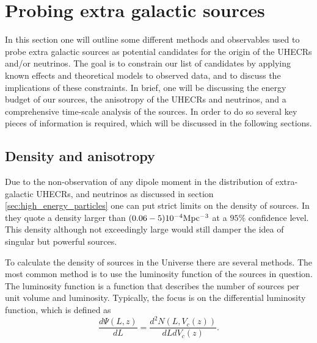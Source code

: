 \section{Probing extra galactic sources}

In this section one will outline some different methods and observables used to probe extra galactic sources as potential candidates for the origin of the UHECRs and/or neutrinos. The goal is to constrain our list of candidates by applying known effects and theoretical models to observed data, and to discuss the implications of these constraints. In brief, one will be discussing the energy budget of our sources, the anisotropy of the UHECRs and neutrinos, and a comprehensive time-scale analysis of the sources. In order to do so several key pieces of information is required, which will be discussed in the following sections.


\subsection{Density and anisotropy}

Due to the non-observation of any dipole moment in the distribution of extra-galactic UHECRs, and neutrinos as discussed in section \ref{sec:high_energy_particles} one can put strict limits on the density of sources. In \cite{ThePierreAugercollaboration_2013} they quote a density larger than $(0.06-5) 10^{-4} \rm{Mpc^{-3}}$ at a $95\% $ confidence level. This density although not exceedingly large would still damper the idea of singular but powerful sources. 

To calculate the density of sources in the Universe there are several methods. The most common method is to use the luminosity function of the sources in question.
The luminosity function is a function that describes the number of sources per unit volume and luminosity. Typically, the focus is on the differential luminosity function, which is defined as
\begin{equation}
    \frac{d\Psi(L,z)}{dL} = \frac{d^2N(L,V_c(z))}{dLdV_c(z)}.
\end{equation}


